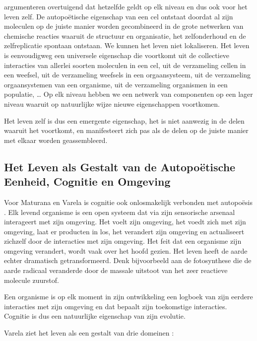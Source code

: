 \documentclass[
  11pt,
]{book}
\begin{document}
\citet{capraLuisi2014} argumenteren overtuigend dat hetzelfde geldt op elk niveau en dus ook voor het leven zelf. De autopoëtische eigenschap van een cel ontstaat doordat al zijn moleculen op de juiste manier worden gecombineerd in de grote netwerken van chemische reacties waaruit de structuur en organisatie, het zelfonderhoud en de zelfreplicatie spontaan ontstaan. We kunnen het leven niet lokaliseren. Het leven is eenvoudigweg een universele eigenschap die voortkomt uit de collectieve interacties van allerlei soorten moleculen in een cel, uit de verzameling cellen in een weefsel, uit de verzameling weefsels in een orgaansysteem, uit de verzameling orgaansystemen van een organisme, uit de verzameling organismen in een populatie, \ldots{} Op elk niveau hebben we een netwerk van componenten op een lager niveau waaruit op natuurlijke wijze nieuwe eigenschappen voortkomen.

Het leven zelf is dus een emergente eigenschap, het is niet aanwezig in de delen waaruit het voortkomt, en manifesteert zich pas als de delen op de juiste manier met elkaar worden geassembleerd.

\hypertarget{het-leven-als-gestalt-van-de-autopouxebtische-eenheid-cognitie-en-omgeving}{%
\subsection{Het Leven als Gestalt van de Autopoëtische Eenheid, Cognitie en Omgeving}\label{het-leven-als-gestalt-van-de-autopouxebtische-eenheid-cognitie-en-omgeving}}

Voor Maturana en Varela is cognitie ook onlosmakelijk verbonden met autopoësis \citep{capraLuisi2014}. Elk levend organisme is een open systeem dat via zijn sensorische arsenaal interageert met zijn omgeving. Het voelt zijn omgeving, het voedt zich met zijn omgeving, laat er producten in los, het verandert zijn omgeving en actualiseert zichzelf door de interacties met zijn omgeving. Het feit dat een organisme zijn omgeving verandert, wordt vaak over het hoofd gezien. Het leven heeft de aarde echter dramatisch getransformeerd. Denk bijvoorbeeld aan de fotosynthese die de aarde radicaal veranderde door de massale uitstoot van het zeer reactieve molecule zuurstof.

Een organisme is op elk moment in zijn ontwikkeling een logboek van zijn eerdere interacties met zijn omgeving en dat bepaalt zijn toekomstige interacties. Cognitie is dus een natuurlijke eigenschap van zijn evolutie.

Varela ziet het leven als een gestalt van drie domeinen \citep{capraLuisi2014}:
\end{document}
